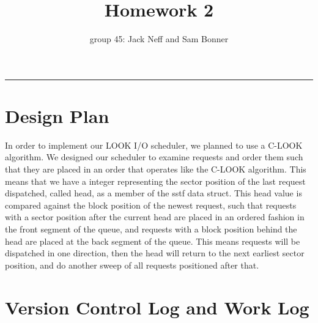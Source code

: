 \documentclass[letterpaper,10pt,fleqn]{article}
\title{Homework 2}
\author{group 45: Jack Neff and Sam Bonner}
\begin{document}
\maketitle
\hrule

\section*{Design Plan}

In order to implement our LOOK I/O scheduler, we planned to use a C-LOOK algorithm. We designed our scheduler to examine requests and order them such that they are placed in an order that operates like the C-LOOK algorithm. This means that we have a integer representing the sector position of the last request dispatched, called head, as a member of the sstf data struct. This head value is compared against the block position of the newest request, such that requests with a sector position after the current head are placed in an ordered fashion in the front segment of the queue, and requests with a block position behind the head are placed at the back segment of the queue. This means requests will be dispatched in one direction, then the head will return to the next earliest sector position, and do another sweep of all requests positioned after that.

\section{Version Control Log and Work Log}
 
\end{document}
